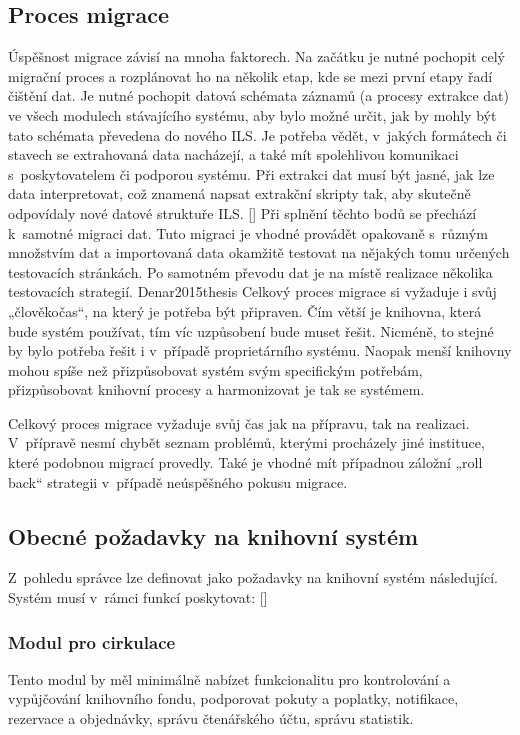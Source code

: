 \documentclass[
	11pt, oneside, printed, final, palatino, monochrome
	microtype,
	table,   %
	lof,     %
	lot     %
]{fithesis3}
\newcommand{\citepages}[2]{[\cite[#1]{#2}]}
\begin{document}
{\subsection{Proces migrace}
Úspěšnost migrace závisí na mnoha faktorech. Na začátku je nutné pochopit celý migrační proces a rozplánovat ho na několik etap, kde se mezi první etapy řadí čištění dat. Je nutné pochopit datová schémata záznamů (a procesy extrakce dat) ve všech modulech stávajícího systému, aby bylo možné určit, jak by mohly být tato schémata převedena do nového ILS. Je potřeba vědět, v~jakých formátech či stavech se extrahovaná data nacházejí, a také mít spolehlivou komunikaci s~poskytovatelem či podporou systému. Při extrakci dat musí být jasné, jak lze data interpretovat, což znamená napsat extrakční skripty tak, aby skutečně odpovídaly nové datové struktuře ILS. \citepages{43-48}{krbiwFHfrnvG2ZXf} Při splnění těchto bodů se přechází k~samotné migraci dat. Tuto migraci je vhodné provádět opakovaně s~různým množstvím dat a importovaná data okamžitě testovat na nějakých tomu určených testovacích stránkách. Po samotném převodu dat je na místě realizace několika testovacích strategií. \cite{32-35, 61-72}{Denar2015thesis} Celkový proces migrace si vyžaduje i svůj „člověkočas“, na který je potřeba být připraven. Čím větší je knihovna, která bude systém používat, tím víc uzpůsobení bude muset řešit. Nicméně, to stejné by bylo potřeba řešit i v~případě proprietárního systému. Naopak menší knihovny mohou spíše než přizpůsobovat systém svým specifickým potřebám, přizpůsobovat knihovní procesy a harmonizovat je tak se systémem.

Celkový proces migrace vyžaduje svůj čas jak na přípravu, tak na realizaci. V~přípravě nesmí chybět seznam problémů, kterými procházely jiné instituce, které podobnou migrací provedly. Také je vhodné mít případnou záložní „roll back“ strategii v~případě neúspěšného pokusu migrace.

\subsection{Obecné požadavky na knihovní systém} \label{sec:obecne_pozadavky_na_knihovni_system}
Z~pohledu správce lze definovat jako požadavky na knihovní systém následující.
Systém musí v~rámci funkcí poskytovat: \citepages{8-12}{bilal_c2014}

\subsubsection{Modul pro cirkulace}
Tento modul by měl minimálně nabízet funkcionalitu pro kontrolování a vypůjčování knihovního fondu, podporovat pokuty a poplatky, notifikace, rezervace a objednávky, správu čtenářského účtu, správu statistik.

}
\end{document}
